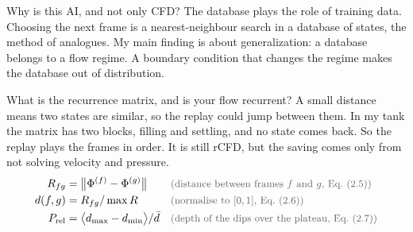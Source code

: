 \begin{qabox}{Why is this AI, and not only CFD?}
\explain The database plays the role of training data. Choosing the next frame is a
nearest-neighbour search in a database of states, the method of analogues. My main finding is about
generalization: a database belongs to a flow regime. A boundary condition that changes the regime
makes the database out of distribution.
\end{qabox}

\begin{qabox}{What is the recurrence matrix, and is your flow recurrent?}
\explain A small distance means two states are similar, so the replay could jump between them. In
my tank the matrix has two blocks, filling and settling, and no state comes back. So the replay
plays the frames in order. It is still rCFD, but the saving comes only from not solving velocity
and pressure.
\derive
\begin{align*}
R_{fg} &= \bigl\lVert \Phi^{(f)} - \Phi^{(g)} \bigr\rVert \why{distance between frames $f$ and $g$, Eq.~(2.5)} \\
d(f,g) &= R_{fg}/\max R \why{normalise to $[0,1]$, Eq.~(2.6)} \\
P_{\mathrm{rel}} &= \bigl\langle d_{\max} - d_{\min} \bigr\rangle / \bar{d} \why{depth of the dips over the plateau, Eq.~(2.7)}
\end{align*}
\end{qabox}

